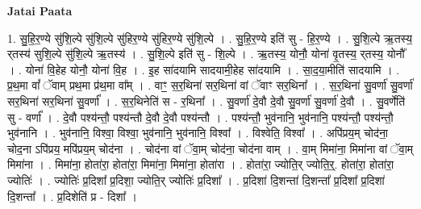 \documentclass[17pt]{extarticle}
\begin{document}
\textbf{Jatai Paata} \newline

1. सु॒हि॒र॒ण्ये सु॑शि॒ल्पे सु॑शि॒ल्पे सु॑हिर॒ण्ये सु॑हिर॒ण्ये सु॑शि॒ल्पे । . सु॒हि॒र॒ण्ये इति॑ सु - हि॒र॒ण्ये । . सु॒शि॒ल्पे ऋ॒तस्य॒ र्‌तस्य॑ सुशि॒ल्पे सु॑शि॒ल्पे ऋ॒तस्य॑ । . सु॒शि॒ल्पे इति॑ सु - शि॒ल्पे । . ऋ॒तस्य॒ योनौ॒ योना॑ वृ॒तस्य॒ र्‌तस्य॒ योनौ᳚ । . योना॑ वि॒हेह योनौ॒ योना॑ वि॒ह । . इ॒ह सा॑दयामि सादयामी॒हेह सा॑दयामि । . सा॒द॒या॒मीति॑ सादयामि । . प्र॒थ॒मा वां᳚ ॅवाम् प्रथ॒मा प्र॑थ॒मा वा᳚म् । . वाꣳ॒॒ स॒र॒थिना॑ सर॒थिना॑ वां ॅवाꣳ सर॒थिना᳚ । . स॒र॒थिना॑ सु॒वर्णा॑ सु॒वर्णा॑ सर॒थिना॑ सर॒थिना॑ सु॒वर्णा᳚ । . स॒र॒थिनेति॑ स - र॒थिना᳚ । . सु॒वर्णा॑ दे॒वौ दे॒वौ सु॒वर्णा॑ सु॒वर्णा॑ दे॒वौ । . सु॒वर्णेति॑ सु - वर्णा᳚ । . दे॒वौ पश्य॑न्तौ॒ पश्य॑न्तौ दे॒वौ दे॒वौ पश्य॑न्तौ । . पश्य॑न्तौ॒ भुव॑नानि॒ भुव॑नानि॒ पश्य॑न्तौ॒ पश्य॑न्तौ॒ भुव॑नानि । . भुव॑नानि॒ विश्वा॒ विश्वा॒ भुव॑नानि॒ भुव॑नानि॒ विश्वा᳚ । . विश्वेति॒ विश्वा᳚ । . अपि॑प्रय॒म् चोद॑ना॒ चोद॒ना ऽपि॑प्रय॒ मपि॑प्रय॒म् चोद॑ना । . चोद॑ना वां ॅवा॒म् चोद॑ना॒ चोद॑ना वाम् । . वा॒म् मिमा॑ना॒ मिमा॑ना वां ॅवा॒म् मिमा॑ना । . मिमा॑ना॒ होता॑रा॒ होता॑रा॒ मिमा॑ना॒ मिमा॑ना॒ होता॑रा । . होता॑रा॒ ज्योति॒र् ज्योति॒र्॒. होता॑रा॒ होता॑रा॒ ज्योतिः॑ । . ज्योतिः॑ प्र॒दिशा᳚ प्र॒दिशा॒ ज्योति॒र् ज्योतिः॑ प्र॒दिशा᳚ । . प्र॒दिशा॑ दि॒शन्ता॑ दि॒शन्ता᳚ प्र॒दिशा᳚ प्र॒दिशा॑ दि॒शन्ता᳚ । . प्र॒दिशेति॑ प्र - दिशा᳚ । \newline
\end{document}

